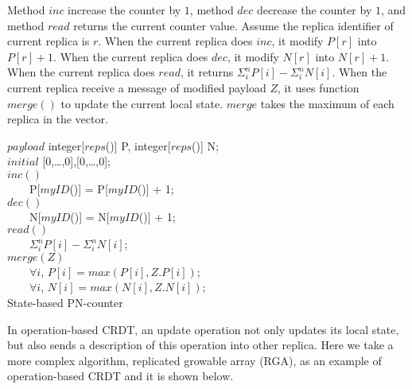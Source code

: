 {Method $\mathit{inc}$ increase the counter by $1$, method $\mathit{dec}$ decrease the counter by $1$, and method $\mathit{read}$ returns the current counter value. Assume the replica identifier of current replica is $r$. When the current replica does $\mathit{inc}$, it modify $P[r]$ into $P[r]+1$. When the current replica does $\mathit{dec}$, it modify $N[r]$ into $N[r]+1$. When the current replica does $\mathit{read}$, it returns $\Sigma_{i}^{n} P[i] - \Sigma_{i}^{n} N[i]$. When the current replica receive a message of modified payload $Z$, it uses function $\mathit{merge}()$ to update the current local state. $\mathit{merge}$ takes the maximum of each replica in the vector.

\renewcommand{\algorithmcfname}{CRDT Implementation}
\noindent
\noindent\begin{algorithm}[H]
$\mathit{payload}$ integer[$\mathit{reps}$()] P, integer[$\mathit{reps}$()] N; \\
$\mathit{initial}$ [0,\ldots,0],[0,\ldots,0]; \\

$\mathit{inc}()$ \\
\ \ \ \ P[$\mathit{myID}$()] = P[$\mathit{myID}$()] + 1; \\

$\mathit{dec}()$ \\
\ \ \ \ N[$\mathit{myID}$()] = N[$\mathit{myID}$()] + 1; \\

$\mathit{read}()$ \\
\ \ \ \ \KwRet $\Sigma_{i}^{n} P[i] - \Sigma_{i}^{n} N[i]$; \\

$\mathit{merge}(Z)$ \\
\ \ \ \ $\forall i$, $P[i] = \mathit{max}(P[i],Z.P[i])$; \\
\ \ \ \ $\forall i$, $N[i] = \mathit{max}(N[i],Z.N[i])$; \\
\caption{State-based PN-counter}
\label{Method1}
\end{algorithm}

In operation-based CRDT, an update operation not only updates its local state, but also sends a description of this operation into other replica. Here we take a more complex algorithm, replicated growable array (RGA), as an example of operation-based CRDT and it is shown below.

}
